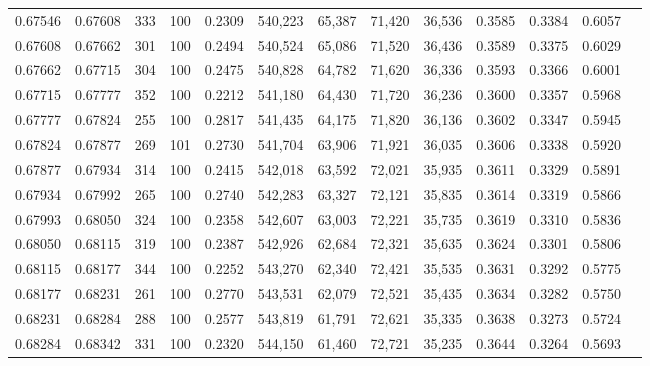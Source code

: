 \begin{tabular}{rrrrrrrrrrrrr}
0.67546 & 0.67608 &   333 & 100 &                                     0.2309 & 540,223 &  65,387 &  71,420 &  36,536 & 0.3585 & 0.3384 & 0.6057 \\
0.67608 & 0.67662 &   301 & 100 &                                     0.2494 & 540,524 &  65,086 &  71,520 &  36,436 & 0.3589 & 0.3375 & 0.6029 \\
0.67662 & 0.67715 &   304 & 100 &                                     0.2475 & 540,828 &  64,782 &  71,620 &  36,336 & 0.3593 & 0.3366 & 0.6001 \\
0.67715 & 0.67777 &   352 & 100 &                                     0.2212 & 541,180 &  64,430 &  71,720 &  36,236 & 0.3600 & 0.3357 & 0.5968 \\
0.67777 & 0.67824 &   255 & 100 &                                     0.2817 & 541,435 &  64,175 &  71,820 &  36,136 & 0.3602 & 0.3347 & 0.5945 \\
0.67824 & 0.67877 &   269 & 101 &                                     0.2730 & 541,704 &  63,906 &  71,921 &  36,035 & 0.3606 & 0.3338 & 0.5920 \\
0.67877 & 0.67934 &   314 & 100 &                                     0.2415 & 542,018 &  63,592 &  72,021 &  35,935 & 0.3611 & 0.3329 & 0.5891 \\
0.67934 & 0.67992 &   265 & 100 &                                     0.2740 & 542,283 &  63,327 &  72,121 &  35,835 & 0.3614 & 0.3319 & 0.5866 \\
0.67993 & 0.68050 &   324 & 100 &                                     0.2358 & 542,607 &  63,003 &  72,221 &  35,735 & 0.3619 & 0.3310 & 0.5836 \\
0.68050 & 0.68115 &   319 & 100 &                                     0.2387 & 542,926 &  62,684 &  72,321 &  35,635 & 0.3624 & 0.3301 & 0.5806 \\
0.68115 & 0.68177 &   344 & 100 &                                     0.2252 & 543,270 &  62,340 &  72,421 &  35,535 & 0.3631 & 0.3292 & 0.5775 \\
0.68177 & 0.68231 &   261 & 100 &                                     0.2770 & 543,531 &  62,079 &  72,521 &  35,435 & 0.3634 & 0.3282 & 0.5750 \\
0.68231 & 0.68284 &   288 & 100 &                                     0.2577 & 543,819 &  61,791 &  72,621 &  35,335 & 0.3638 & 0.3273 & 0.5724 \\
0.68284 & 0.68342 &   331 & 100 &                                     0.2320 & 544,150 &  61,460 &  72,721 &  35,235 & 0.3644 & 0.3264 & 0.5693 \\

\end{tabular}
